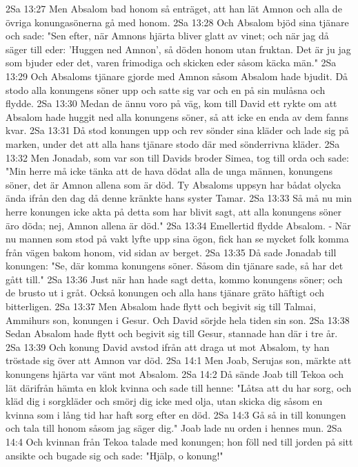 2Sa 13:27  Men Absalom bad honom så enträget, att han lät Amnon och alla de övriga konungasönerna gå med honom.
2Sa 13:28  Och Absalom bjöd sina tjänare och sade: "Sen efter, när Amnons hjärta bliver glatt av vinet; och när jag då säger till eder: 'Huggen ned Amnon', så döden honom utan fruktan. Det är ju jag som bjuder eder det, varen frimodiga och skicken eder såsom käcka män."
2Sa 13:29  Och Absaloms tjänare gjorde med Amnon såsom Absalom hade bjudit. Då stodo alla konungens söner upp och satte sig var och en på sin mulåsna och flydde.
2Sa 13:30  Medan de ännu voro på väg, kom till David ett rykte om att Absalom hade huggit ned alla konungens söner, så att icke en enda av dem fanns kvar.
2Sa 13:31  Då stod konungen upp och rev sönder sina kläder och lade sig på marken, under det att alla hans tjänare stodo där med sönderrivna kläder.
2Sa 13:32  Men Jonadab, som var son till Davids broder Simea, tog till orda och sade: "Min herre må icke tänka att de hava dödat alla de unga männen, konungens söner, det är Amnon allena som är död. Ty Absaloms uppsyn har bådat olycka ända ifrån den dag då denne kränkte hans syster Tamar.
2Sa 13:33  Så må nu min herre konungen icke akta på detta som har blivit sagt, att alla konungens söner äro döda; nej, Amnon allena är död."
2Sa 13:34  Emellertid flydde Absalom. - När nu mannen som stod på vakt lyfte upp sina ögon, fick han se mycket folk komma från vägen bakom honom, vid sidan av berget.
2Sa 13:35  Då sade Jonadab till konungen: "Se, där komma konungens söner. Såsom din tjänare sade, så har det gått till."
2Sa 13:36  Just när han hade sagt detta, kommo konungens söner; och de brusto ut i gråt. Också konungen och alla hans tjänare gräto häftigt och bitterligen.
2Sa 13:37  Men Absalom hade flytt och begivit sig till Talmai, Ammihurs son, konungen i Gesur. Och David sörjde hela tiden sin son.
2Sa 13:38  Sedan Absalom hade flytt och begivit sig till Gesur, stannade han där i tre år.
2Sa 13:39  Och konung David avstod ifrån att draga ut mot Absalom, ty han tröstade sig över att Amnon var död.
2Sa 14:1  Men Joab, Serujas son, märkte att konungens hjärta var vänt mot Absalom.
2Sa 14:2  Då sände Joab till Tekoa och lät därifrån hämta en klok kvinna och sade till henne: "Låtsa att du har sorg, och kläd dig i sorgkläder och smörj dig icke med olja, utan skicka dig såsom en kvinna som i lång tid har haft sorg efter en död.
2Sa 14:3  Gå så in till konungen och tala till honom såsom jag säger dig." Joab lade nu orden i hennes mun.
2Sa 14:4  Och kvinnan från Tekoa talade med konungen; hon föll ned till jorden på sitt ansikte och bugade sig och sade: "Hjälp, o konung!"
